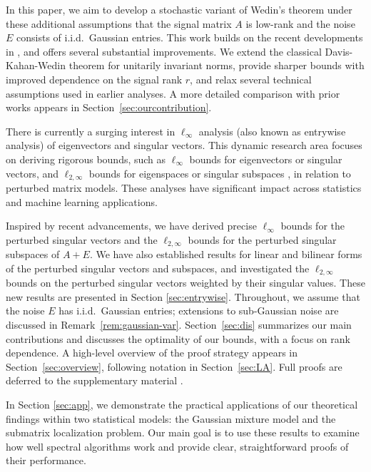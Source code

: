 \documentclass[reqno]{amsart}
\theoremstyle{plain}
\theoremstyle{definition}
\begin{document}
In this paper, we aim to develop a stochastic variant of Wedin's theorem under these additional assumptions that the signal matrix $A$ is low-rank and the noise $E$ consists of i.i.d.\ Gaussian entries. This work builds on the recent developments in \cite{OVW2, OVW22}, and offers several substantial improvements. We extend the classical Davis-Kahan-Wedin theorem for unitarily invariant norms, provide sharper bounds with improved dependence on the signal rank $r$, and relax several technical assumptions used in earlier analyses. A more detailed comparison with prior works appears in Section~\ref{sec:ourcontribution}.

There is currently a surging interest in $\ell_\infty$ analysis (also known as entrywise analysis) of eigenvectors and singular vectors. This dynamic research area focuses on deriving rigorous bounds, such as $\ell_\infty$ bounds \cite{FWZ17,ZB18, EBW18, CFMW19,AFWZ20,BV23} for eigenvectors or singular vectors, and $\ell_{2,\infty}$ bounds for eigenspaces or singular subspaces \cite{CTP19, Lei19, CLCPC21,AFW22, ALP22}, in relation to perturbed matrix models. These analyses have significant impact across statistics and machine learning applications.

Inspired by recent advancements, we have derived  precise $\ell_\infty$ bounds for the perturbed singular vectors and the $\ell_{2,\infty}$ bounds for the perturbed singular subspaces of $A+E$. We have also established results for linear and bilinear forms of the perturbed singular vectors and subspaces, and investigated the $\ell_{2,\infty}$ bounds on the perturbed singular vectors weighted by their singular values. These new results are presented in Section \ref{sec:entrywise}. Throughout, we assume that the noise $E$ has i.i.d.\  Gaussian entries; extensions to sub-Gaussian noise are discussed in Remark~\ref{rem:gaussian-var}. Section~\ref{sec:dis} summarizes our main contributions and discusses the optimality of our bounds, with a focus on rank dependence. A high-level overview of the proof strategy appears in Section~\ref{sec:overview}, following notation in Section~\ref{sec:LA}. Full proofs are deferred to the supplementary material \cite{WangSupp24}.

In Section \ref{sec:app}, we demonstrate the practical applications of our theoretical findings within two statistical models: the Gaussian mixture model and the submatrix localization problem. Our main goal is to use these results to examine how well spectral algorithms work and provide clear, straightforward proofs of their performance.
\end{document}
